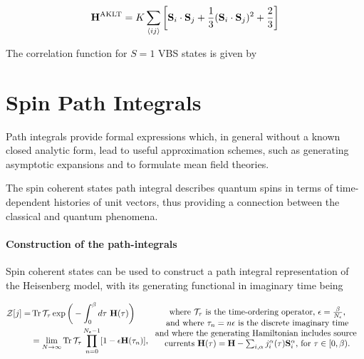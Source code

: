 \documentclass{homework}
\begin{document}
\begin{equation}
    {\bf H}^{\textnormal{AKLT}} = K \sum_{\langle ij \rangle} \bigg[{\bf S}_i \cdot {\bf S}_j + \frac{1}{3} ({\bf S}_i \cdot {\bf S}_j)^2 + \frac{2}{3}\bigg]
\end{equation}

The correlation function for $S=1$ VBS states is given by 
\fi

\section{\textbf{Spin Path Integrals}}

Path integrals provide formal expressions which, in general without a known closed analytic form, lead to useful approximation schemes, such as generating asymptotic expansions and to formulate mean field theories. 

The spin coherent states path integral describes quantum spins in terms of time-dependent histories of unit vectors, thus providing a connection between the classical and quantum phenomena. \\

\paragraph{Construction of the path-integrals}

Spin coherent states can be used to construct a path integral representation of the Heisenberg model, with its generating functional in imaginary time being 

\begin{equation}
\begin{split}
    \mathcal{Z}[j] =& \Tr \mathcal{T}_{\tau} \exp \bigg(-\int_{0}^\beta d\tau \textnormal{ } {\bf H}(\tau)\bigg)  \\
    &= \lim_{N \rightarrow \infty} \Tr \mathcal{T}_{\tau} \prod_{n=0}^{N_{\epsilon} - 1} [1-\epsilon {\bf H}(\tau_n)],
\end{split} \begin{array}{cc}
         \textnormal{ where $\mathcal{T}_\tau$ is the time-ordering operator, $\epsilon = \frac{\beta}{N_{\epsilon}}$,}  \\
         \textnormal{  and where $\tau_n = n \epsilon$ is the discrete imaginary time} \\
         \textnormal{ and where the generating Hamiltonian includes source } \\
         \textnormal{ currents ${\bf H}(\tau) = {\bf H} - \sum_{i, \alpha} j_i^\alpha(\tau) {\bf S}_i^\alpha$, for $\tau \in [0, \beta).$}
    \end{array}
\end{equation}
\end{document}
